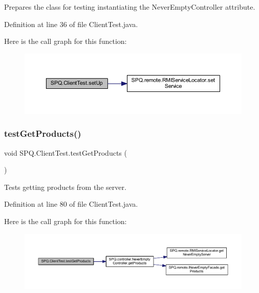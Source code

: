 Prepares the class for testing instantiating the Never\+Empty\+Controller attribute. 

Definition at line 36 of file Client\+Test.\+java.

Here is the call graph for this function\+:
\nopagebreak
\begin{figure}[H]
\begin{center}
\leavevmode
\includegraphics[width=350pt]{class_s_p_q_1_1_client_test_abcdab9dbc12c8a65ebbfb96877e4d5a1_cgraph}
\end{center}
\end{figure}
\mbox{\label{class_s_p_q_1_1_client_test_ab83877066a3bb92e514ca496cb96cdbf}} 
\subsubsection{\texorpdfstring{test\+Get\+Products()}{testGetProducts()}}
{\footnotesize\ttfamily void S\+P\+Q.\+Client\+Test.\+test\+Get\+Products (\begin{DoxyParamCaption}{ }\end{DoxyParamCaption})}

Tests getting products from the server. 

Definition at line 80 of file Client\+Test.\+java.

Here is the call graph for this function\+:
\nopagebreak
\begin{figure}[H]
\begin{center}
\leavevmode
\includegraphics[width=350pt]{class_s_p_q_1_1_client_test_ab83877066a3bb92e514ca496cb96cdbf_cgraph}
\end{center}
\end{figure}
\mbox{\label{class_s_p_q_1_1_client_test_a611b894c9d3826db1d2104e2aae23267}} 
